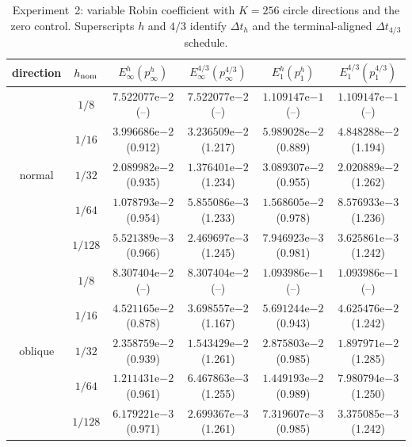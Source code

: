 \documentclass[11pt]{article}
\theoremstyle{definition}
\theoremstyle{remark}
\begin{document}
\begin{table}[htbp]
 \centering
 \scriptsize
 \setlength{\tabcolsep}{2.6pt}
 \renewcommand{\arraystretch}{0.90}
 \caption{Experiment~2: variable Robin coefficient with $K=256$ circle
 directions and the zero control.  Superscripts $h$ and $4/3$ identify
 $\Delta t_h$ and the terminal-aligned $\Delta t_{4/3}$ schedule.}
 \label{tab:ex2-robin}
 \begin{tabular}{cccccc}
  \toprule
  direction & $h_{\rm nom}$ & $E_\infty^h(p_\infty^h)$
  & $E_\infty^{4/3}(p_\infty^{4/3})$
  & $E_1^h(p_1^h)$ & $E_1^{4/3}(p_1^{4/3})$\\
  \midrule
  \multirow{5}{*}{normal}
  & $1/8$   & $7.522077\mathrm e{-2}$ (--)    & $7.522077\mathrm e{-2}$ (--)    & $1.109147\mathrm e{-1}$ (--)    & $1.109147\mathrm e{-1}$ (--)\\
  & $1/16$  & $3.996686\mathrm e{-2}$ (0.912) & $3.236509\mathrm e{-2}$ (1.217) & $5.989028\mathrm e{-2}$ (0.889) & $4.848288\mathrm e{-2}$ (1.194)\\
  & $1/32$  & $2.089982\mathrm e{-2}$ (0.935) & $1.376401\mathrm e{-2}$ (1.234) & $3.089307\mathrm e{-2}$ (0.955) & $2.020889\mathrm e{-2}$ (1.262)\\
  & $1/64$  & $1.078793\mathrm e{-2}$ (0.954) & $5.855086\mathrm e{-3}$ (1.233) & $1.568605\mathrm e{-2}$ (0.978) & $8.576933\mathrm e{-3}$ (1.236)\\
  & $1/128$ & $5.521389\mathrm e{-3}$ (0.966) & $2.469697\mathrm e{-3}$ (1.245) & $7.946923\mathrm e{-3}$ (0.981) & $3.625861\mathrm e{-3}$ (1.242)\\
  \midrule
  \multirow{5}{*}{oblique}
  & $1/8$   & $8.307404\mathrm e{-2}$ (--)    & $8.307404\mathrm e{-2}$ (--)    & $1.093986\mathrm e{-1}$ (--)    & $1.093986\mathrm e{-1}$ (--)\\
  & $1/16$  & $4.521165\mathrm e{-2}$ (0.878) & $3.698557\mathrm e{-2}$ (1.167) & $5.691244\mathrm e{-2}$ (0.943) & $4.625476\mathrm e{-2}$ (1.242)\\
  & $1/32$  & $2.358759\mathrm e{-2}$ (0.939) & $1.543429\mathrm e{-2}$ (1.261) & $2.875803\mathrm e{-2}$ (0.985) & $1.897971\mathrm e{-2}$ (1.285)\\
  & $1/64$  & $1.211431\mathrm e{-2}$ (0.961) & $6.467863\mathrm e{-3}$ (1.255) & $1.449193\mathrm e{-2}$ (0.989) & $7.980794\mathrm e{-3}$ (1.250)\\
  & $1/128$ & $6.179221\mathrm e{-3}$ (0.971) & $2.699367\mathrm e{-3}$ (1.261) & $7.319607\mathrm e{-3}$ (0.985) & $3.375085\mathrm e{-3}$ (1.242)\\
  \bottomrule
 \end{tabular}
\end{table}
\end{document}
